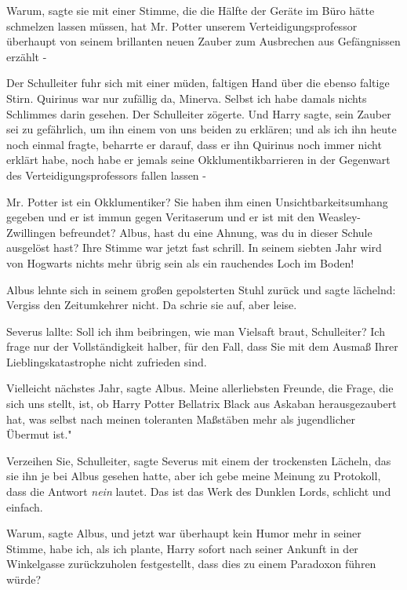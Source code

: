 \glqq Warum\grqq{}, sagte sie mit einer Stimme, die die Hälfte der Geräte im
Büro hätte schmelzen lassen müssen, \glqq hat Mr. Potter unserem
Verteidigungsprofessor überhaupt von seinem brillanten neuen Zauber zum
Ausbrechen aus Gefängnissen erzählt -\grqq{}

Der Schulleiter fuhr sich mit einer müden, faltigen Hand über die ebenso faltige
Stirn. \glqq Quirinus war nur zufällig da, Minerva. Selbst ich habe damals
nichts Schlimmes darin gesehen.\grqq{} Der Schulleiter zögerte. \glqq Und Harry
sagte, sein Zauber sei zu gefährlich, um ihn einem von uns beiden zu erklären;
und als ich ihn heute noch einmal fragte, beharrte er darauf, dass er ihn
Quirinus noch immer nicht erklärt habe, noch habe er jemals seine
Okklumentikbarrieren in der Gegenwart des Verteidigungsprofessors fallen lassen
-\grqq{}

\glqq Mr. Potter ist ein Okklumentiker? Sie haben ihm einen
Unsichtbarkeitsumhang gegeben und er ist immun gegen Veritaserum und er ist mit
den Weasley-Zwillingen befreundet? Albus, hast du eine Ahnung, was du in dieser
Schule ausgelöst hast?\grqq{} Ihre Stimme war jetzt fast schrill. \glqq In
seinem siebten Jahr wird von Hogwarts nichts mehr übrig sein als ein rauchendes
Loch im Boden!\grqq{}

Albus lehnte sich in seinem großen gepolsterten Stuhl zurück und sagte lächelnd:
\glqq Vergiss den Zeitumkehrer nicht.\grqq{} Da schrie sie auf, aber leise.

Severus lallte: \glqq Soll ich ihm beibringen, wie man Vielsaft braut,
Schulleiter? Ich frage nur der Vollständigkeit halber, für den Fall, dass Sie
mit dem Ausmaß Ihrer Lieblingskatastrophe nicht zufrieden sind.\grqq{}

\glqq Vielleicht nächstes Jahr\grqq{}, sagte Albus. \glqq Meine allerliebsten
Freunde, die Frage, die sich uns stellt, ist, ob Harry Potter Bellatrix Black
aus Askaban herausgezaubert hat, was selbst nach meinen toleranten Maßstäben
mehr als jugendlicher Übermut ist."

\glqq Verzeihen Sie, Schulleiter\grqq{}, sagte Severus mit einem der trockensten
Lächeln, das sie ihn je bei Albus gesehen hatte, \glqq aber ich gebe meine
Meinung zu Protokoll, dass die Antwort \emph{nein} lautet. Das ist das Werk des
Dunklen Lords, schlicht und einfach.\grqq{}

\glqq Warum\grqq{}, sagte Albus, und jetzt war überhaupt kein Humor mehr in
seiner Stimme, \glqq habe ich, als ich plante, Harry sofort nach seiner Ankunft
in der Winkelgasse zurückzuholen festgestellt, dass dies zu einem Paradoxon
führen würde?\grqq{}

